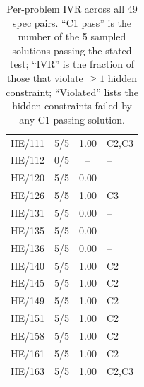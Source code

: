 \documentclass[11pt]{article}
\begin{document}
\begin{table}[ht]
\begin{tabular}{@{}lccl@{}}
HE/111 & 5/5 & 1.00 & C2,C3 \\
HE/112 & 0/5 & -- & -- \\
HE/120 & 5/5 & 0.00 & -- \\
HE/126 & 5/5 & 1.00 & C3 \\
HE/131 & 5/5 & 0.00 & -- \\
HE/135 & 5/5 & 0.00 & -- \\
HE/136 & 5/5 & 0.00 & -- \\
HE/140 & 5/5 & 1.00 & C2 \\
HE/145 & 5/5 & 1.00 & C2 \\
HE/149 & 5/5 & 1.00 & C2 \\
HE/151 & 5/5 & 1.00 & C2 \\
HE/158 & 5/5 & 1.00 & C2 \\
HE/161 & 5/5 & 1.00 & C2 \\
HE/163 & 5/5 & 1.00 & C2,C3 \\
\bottomrule
\end{tabular}
\caption{Per-problem IVR across all 49 spec pairs. ``C1 pass'' is the
number of the 5 sampled solutions passing the stated test; ``IVR'' is the
fraction of those that violate $\geq 1$ hidden constraint; ``Violated''
lists the hidden constraints failed by any C1-passing solution.}
\label{tab:per-problem}
\end{table}
\end{document}
